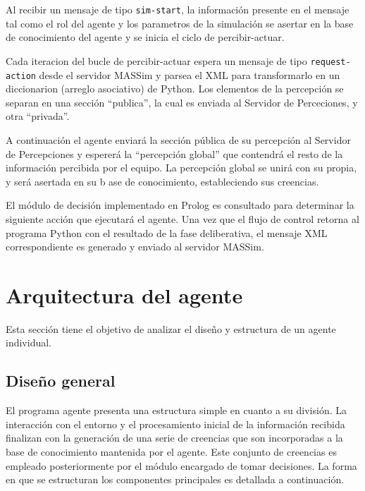  Al recibir un mensaje de tipo \texttt{sim-start}, la información 
 presente en el mensaje tal como el rol del agente y los parametros
 de la simulación se asertar en la base de conocimiento del agente y 
 se inicia el ciclo de percibir-actuar.

 Cada iteracion del bucle de percibir-actuar espera un mensaje de tipo
 \texttt{request-action} desde el servidor MASSim y parsea el XML para
 transformarlo en un diccionarion (arreglo asociativo) de Python. 
 Los elementos de la percepción se separan en una sección ``publica'', 
 la cual es enviada al Servidor de Perceciones, y otra ``privada''.

 A continuación el agente enviará la sección pública de su percepción 
 al Servidor de Percepciones y espererá la ``percepción global'' que 
 contendrá el resto de la información percibida por el equipo. 
 La percepción global se unirá con su propia, y será asertada en su 
 b
 ase de conocimiento, estableciendo sus creencias. 

 El módulo de decisión implementado en Prolog es consultado para 
 determinar la siguiente acción que ejecutará el agente. 
 Una vez que el flujo de control retorna al programa Python con el 
 resultado de la fase deliberativa, el mensaje XML correspondiente es 
 generado y enviado al servidor MASSim.   

\section{Arquitectura del agente}
 \label{sec:arquitectura_agente}

 Esta sección tiene el objetivo de analizar el diseño y estructura de 
 un agente individual.

\subsection{Diseño general}
 \label{sub:diseno_general}
 
 El programa agente presenta una estructura simple en cuanto a su
 división.
 La interacción con el entorno y el procesamiento inicial de la
 información recibida finalizan con la generación de una serie de
 creencias que son incorporadas a la base de conocimiento mantenida por
 el agente.
 Este conjunto de creencias es empleado posteriormente por el módulo
 encargado de tomar decisiones.
 La forma en que se estructuran los componentes principales es
 detallada a continuación.

